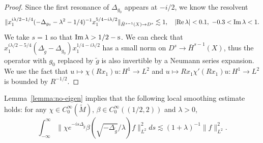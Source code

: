 \documentclass[10pt]{amsart}
\renewcommand{\Re}{\rm{Re} \,}
\renewcommand{\Im}{\rm{Im} \,}
\newcommand{\1}{{\bf 1}}
\begin{document}
\begin{proof}

Since the first resonance of $\Delta_{g_0}$ appears at $-i/2$, we know the resolvent
\begin{equation*}
    \|x_1^{i\lambda/2-1/4}(-\Delta_{g_0}-\lambda^2-1/4)^{-1} x_1^{5/4-i\lambda/2}\|_{\bar{H}^{s-1}(X)\to D^s}\lesssim 1, \quad |\Re \lambda|<0.1,\,\,  -0.3<\Im \lambda<1.
\end{equation*}
We take $s=1$ so that $\Im \lambda>1/2-s$.
We can check that $x_1^{i\lambda/2-5/4}(\Delta_{\tilde g}-\Delta_{g_0})x_1^{1/4-i\lambda/2}$ has a small norm on $D^s\to \bar{H}^{s-1}(X)$, thus the operator with $g_0$ replaced by $\tilde g$ is also invertible by a Neumann series expansion. We use the fact that $u\mapsto \chi(Rx_1) u : H^{1}\to L^2$ and $u\mapsto Rx_1\chi'(Rx_1) u : H^{1}\to L^2$ is bounded by $R^{-1/2}$.
\end{proof}

Lemma~\ref{lemma:no-eigen} implies that the following local smoothing estimate holds: for any $\chi\in C_0^{\infty}(\tilde{M})$, $\beta\in C_0^{\infty}((1/2,2))$ and $\lambda>0$,
\begin{equation}\label{eq:local-sm-tilde}
    \int_{-\infty}^{\infty}\|\chi e^{-is\Delta_{\tilde{g}}} \beta(\sqrt{-\Delta_{\tilde{g}}}/\lambda) f\|_{L^2}^2 ds \lesssim (1+\lambda)^{-1}\|f\|_{L^2}^2.
\end{equation}
\end{document}
